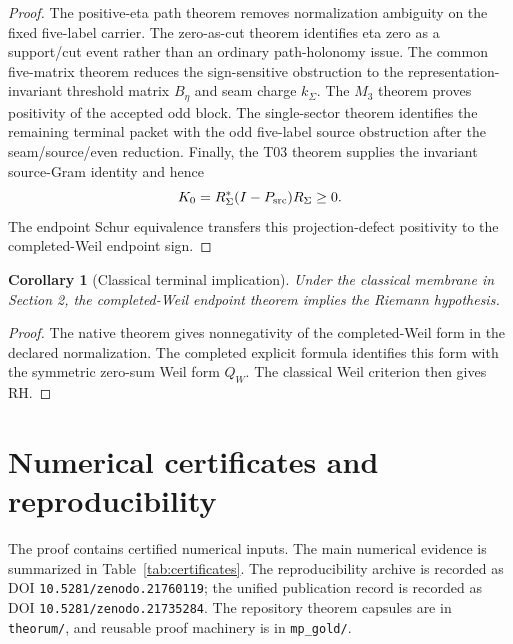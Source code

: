 \documentclass[11pt]{article}
\newtheorem{corollary}[theorem]{Corollary}
\newcommand{\Psrc}{P_{\rm src}}
\newcommand{\RSigma}{R_\Sigma}
\newcommand{\BSEta}{B_\eta}
\newcommand{\kSigma}{k_\Sigma}
\begin{document}
\begin{proof}
The positive-eta path theorem removes normalization ambiguity on the fixed five-label carrier.  The zero-as-cut theorem identifies eta zero as a support/cut event rather than an ordinary path-holonomy issue.  The common five-matrix theorem reduces the sign-sensitive obstruction to the representation-invariant threshold matrix \(\BSEta\) and seam charge \(\kSigma\).  The \(M_3\) theorem proves positivity of the accepted odd block.  The single-sector theorem identifies the remaining terminal packet with the odd five-label source obstruction after the seam/source/even reduction.  Finally, the T03 theorem supplies the invariant source-Gram identity and hence
\[
K_0=\RSigma^*(I-\Psrc)\RSigma\ge0.
\]
The endpoint Schur equivalence transfers this projection-defect positivity to the completed-Weil endpoint sign.
\end{proof}

\begin{corollary}[Classical terminal implication]
Under the classical membrane in Section 2, the completed-Weil endpoint theorem implies the Riemann hypothesis.
\end{corollary}

\begin{proof}
The native theorem gives nonnegativity of the completed-Weil form in the declared normalization.  The completed explicit formula identifies this form with the symmetric zero-sum Weil form \(Q_W\).  The classical Weil criterion then gives RH.
\end{proof}

\section{Numerical certificates and reproducibility}

The proof contains certified numerical inputs.  The main numerical evidence is summarized in Table~\ref{tab:certificates}.  The reproducibility archive is recorded as DOI \texttt{10.5281/zenodo.21760119}; the unified publication record is recorded as DOI \texttt{10.5281/zenodo.21735284}.  The repository theorem capsules are in \texttt{theorum/}, and reusable proof machinery is in \texttt{mp\_gold/}.
\end{document}
